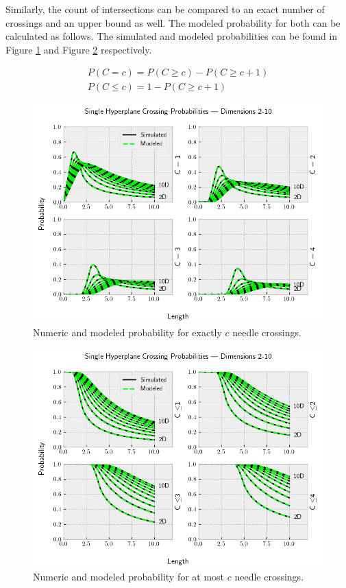 \documentclass{article}
\begin{document}
Similarly, the count of intersections can be compared to an exact number of crossings and an upper
bound as well. The modeled probability for both can be calculated as follows. The simulated and modeled
probabilities can be found in Figure \ref{fig:numeric sim N1 e} and Figure \ref{fig:numeric sim N1 le} respectively.

\begin{gather}
	P(C=c) = P(C\ge c) - P(C\ge c+1) \\
	P(C\le c) = 1 - P(C\ge c+1)
\end{gather}

\begin{figure}
	\centerline{\includegraphics[width=5in]{numeric_sim_N1_e.png}}
	\caption{Numeric and modeled probability for exactly $c$ needle crossings.}
	\label{fig:numeric sim N1 e}
\end{figure}

\begin{figure}
	\centerline{\includegraphics[width=5in]{numeric_sim_N1_le.png}}
	\caption{Numeric and modeled probability for at most $c$ needle crossings.}
	\label{fig:numeric sim N1 le}
\end{figure}
\end{document}
